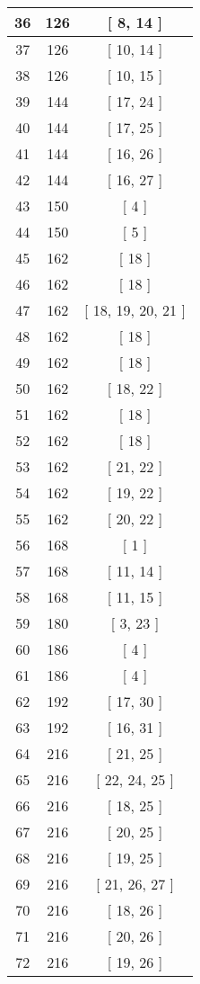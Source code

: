 \begin{center}
\begin{longtable}[H]{|| c c c ||}
36 & 126 & [ 8, 14 ] \\ 
\hline
37 & 126 & [ 10, 14 ] \\ 
\hline
38 & 126 & [ 10, 15 ] \\ 
\hline
39 & 144 & [ 17, 24 ] \\ 
\hline
40 & 144 & [ 17, 25 ] \\ 
\hline
41 & 144 & [ 16, 26 ] \\ 
\hline
42 & 144 & [ 16, 27 ] \\ 
\hline
43 & 150 & [ 4 ] \\ 
\hline
44 & 150 & [ 5 ] \\ 
\hline
45 & 162 & [ 18 ] \\ 
\hline
46 & 162 & [ 18 ] \\ 
\hline
47 & 162 & [ 18, 19, 20, 21 ] \\ 
\hline
48 & 162 & [ 18 ] \\ 
\hline
49 & 162 & [ 18 ] \\ 
\hline
50 & 162 & [ 18, 22 ] \\ 
\hline
51 & 162 & [ 18 ] \\ 
\hline
52 & 162 & [ 18 ] \\ 
\hline
53 & 162 & [ 21, 22 ] \\ 
\hline
54 & 162 & [ 19, 22 ] \\ 
\hline
55 & 162 & [ 20, 22 ] \\ 
\hline
56 & 168 & [ 1 ] \\ 
\hline
57 & 168 & [ 11, 14 ] \\ 
\hline
58 & 168 & [ 11, 15 ] \\ 
\hline
59 & 180 & [ 3, 23 ] \\ 
\hline
60 & 186 & [ 4 ] \\ 
\hline
61 & 186 & [ 4 ] \\ 
\hline
62 & 192 & [ 17, 30 ] \\ 
\hline
63 & 192 & [ 16, 31 ] \\ 
\hline
64 & 216 & [ 21, 25 ] \\ 
\hline
65 & 216 & [ 22, 24, 25 ] \\ 
\hline
66 & 216 & [ 18, 25 ] \\ 
\hline
67 & 216 & [ 20, 25 ] \\ 
\hline
68 & 216 & [ 19, 25 ] \\ 
\hline
69 & 216 & [ 21, 26, 27 ] \\ 
\hline
70 & 216 & [ 18, 26 ] \\ 
\hline
71 & 216 & [ 20, 26 ] \\ 
\hline
72 & 216 & [ 19, 26 ] \\ 

\end{longtable}
\end{center}
